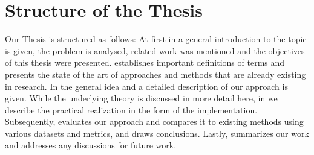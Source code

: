 \section{Structure of the Thesis}
\label{sec:structure_of_thesis}

Our Thesis is structured as follows:
At first in \textbf{} a general introduction to the topic is given, the problem is analysed, related work was mentioned and the objectives of this thesis were presented.
\textbf{} establishes important definitions of terms and presents the state of the art of approaches and methods that are already existing in research.
In \textbf{} the general idea and a detailed description of our approach is given.
While the underlying theory is discussed in more detail here, in \textbf{} we describe the practical realization in the form of the implementation.
Subsequently, \textbf{} evaluates our approach and compares it to existing methods using various datasets and metrics, and draws conclusions.
Lastly, \textbf{} summarizes our work and addresses any discussions for future work.